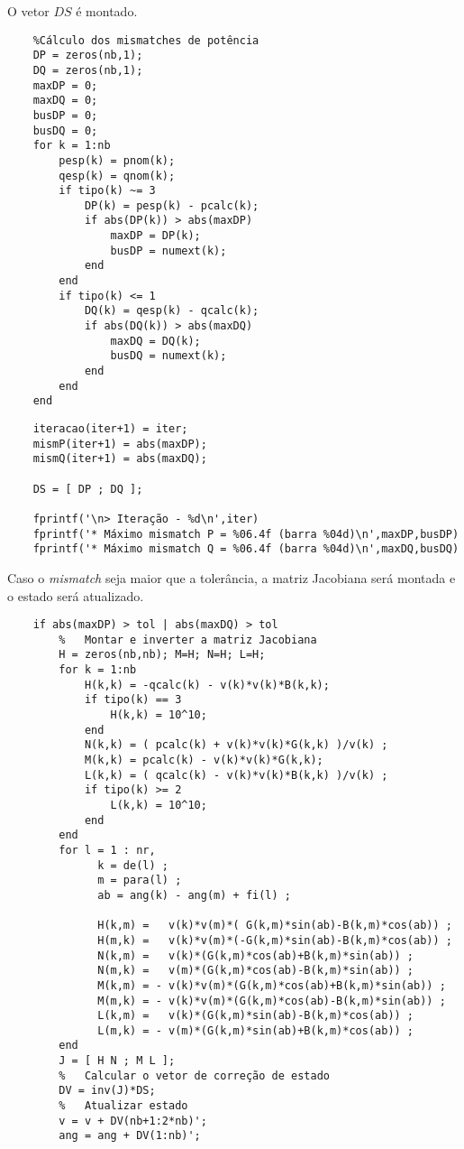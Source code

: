 O vetor $DS$ é montado. 
\begin{verbatim}
    %Cálculo dos mismatches de potência
    DP = zeros(nb,1);
    DQ = zeros(nb,1);
    maxDP = 0;
    maxDQ = 0;
    busDP = 0;
    busDQ = 0;
    for k = 1:nb
        pesp(k) = pnom(k);
        qesp(k) = qnom(k);
        if tipo(k) ~= 3
            DP(k) = pesp(k) - pcalc(k);
            if abs(DP(k)) > abs(maxDP)
                maxDP = DP(k);
                busDP = numext(k);
            end
        end
        if tipo(k) <= 1
            DQ(k) = qesp(k) - qcalc(k);
            if abs(DQ(k)) > abs(maxDQ)
                maxDQ = DQ(k);
                busDQ = numext(k);
            end
        end
    end
\end{verbatim}
\begin{verbatim}
    iteracao(iter+1) = iter;
    mismP(iter+1) = abs(maxDP);
    mismQ(iter+1) = abs(maxDQ);

    DS = [ DP ; DQ ];

    fprintf('\n> Iteração - %d\n',iter)
    fprintf('* Máximo mismatch P = %06.4f (barra %04d)\n',maxDP,busDP)
    fprintf('* Máximo mismatch Q = %06.4f (barra %04d)\n',maxDQ,busDQ)
\end{verbatim}
Caso o \textit{mismatch} seja maior que a tolerância, a matriz Jacobiana será montada e o estado será atualizado.
\begin{verbatim}
    if abs(maxDP) > tol | abs(maxDQ) > tol
        %	Montar e inverter a matriz Jacobiana
        H = zeros(nb,nb); M=H; N=H; L=H;
        for k = 1:nb
            H(k,k) = -qcalc(k) - v(k)*v(k)*B(k,k);
            if tipo(k) == 3
                H(k,k) = 10^10;
            end
            N(k,k) = ( pcalc(k) + v(k)*v(k)*G(k,k) )/v(k) ;
            M(k,k) = pcalc(k) - v(k)*v(k)*G(k,k);
            L(k,k) = ( qcalc(k) - v(k)*v(k)*B(k,k) )/v(k) ;
            if tipo(k) >= 2
                L(k,k) = 10^10;
            end
        end
        for l = 1 : nr,
              k = de(l) ;
              m = para(l) ;
              ab = ang(k) - ang(m) + fi(l) ;
                
              H(k,m) =   v(k)*v(m)*( G(k,m)*sin(ab)-B(k,m)*cos(ab)) ;
              H(m,k) =   v(k)*v(m)*(-G(k,m)*sin(ab)-B(k,m)*cos(ab)) ;
              N(k,m) =   v(k)*(G(k,m)*cos(ab)+B(k,m)*sin(ab)) ;
              N(m,k) =   v(m)*(G(k,m)*cos(ab)-B(k,m)*sin(ab)) ;
              M(k,m) = - v(k)*v(m)*(G(k,m)*cos(ab)+B(k,m)*sin(ab)) ;
              M(m,k) = - v(k)*v(m)*(G(k,m)*cos(ab)-B(k,m)*sin(ab)) ;
              L(k,m) =   v(k)*(G(k,m)*sin(ab)-B(k,m)*cos(ab)) ;
              L(m,k) = - v(m)*(G(k,m)*sin(ab)+B(k,m)*cos(ab)) ;
        end
        J = [ H N ; M L ];
        %	Calcular o vetor de correção de estado
        DV = inv(J)*DS;
        %	Atualizar estado
        v = v + DV(nb+1:2*nb)';
        ang = ang + DV(1:nb)';
        
\end{verbatim}
